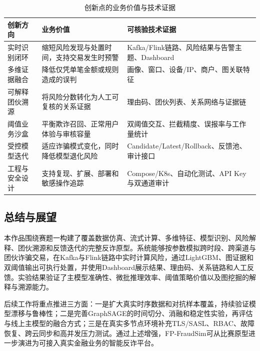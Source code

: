 \begin{table}[H]
  \centering
  \caption{创新点的业务价值与技术证据}
  \label{tab:innovation_value}
  \renewcommand\arraystretch{1.32}
  \setlength{\tabcolsep}{4pt}
  {\songti{}
  \begin{tabularx}{0.97\textwidth}{>{\raggedright\arraybackslash}p{2.4cm}>{\raggedright\arraybackslash}X>{\raggedright\arraybackslash}X}
    \toprule
    创新方向 & 业务价值 & 可核验技术证据 \\
    \midrule
    实时识别闭环 & 缩短风险发现与处置时间，支持交易发生时预警 & Kafka/Flink链路、风险结果与告警主题、Dashboard \\
    多维证据融合 & 降低仅凭单笔金额或规则造成的误判 & 画像、窗口、设备/IP、商户、图关联特征 \\
    可解释团伙溯源 & 将风险分数转化为人工可复核的关系证据 & 理由码、团伙列表、关系网络与证据链 \\
    阈值业务沙盒 & 平衡欺诈召回、正常用户体验与审核容量 & 双阈值交互、拦截精度、误报率与工作量统计 \\
    受控模型迭代 & 适应诈骗模式变化，同时降低模型退化风险 & Candidate/Latest/Rollback、反馈池、审计接口 \\
    工程与安全设计 & 支持复现、扩展、部署和敏感操作追踪 & Compose/K8s、自动化测试、API Key与双通道审计 \\
    \bottomrule
  \end{tabularx}}
\end{table}

\subsection{总结与展望}

本作品围绕赛题一构建了覆盖数据仿真、流式计算、多维特征、模型识别、风险解释、团伙溯源和反馈迭代的完整反诈原型。系统能够按参数模拟跨时段、跨渠道与团伙诈骗交易，在Kafka与Flink链路中实时计算风险，通过LightGBM、图证据和双阈值输出可执行处置，并使用Dashboard展示结果、理由码、关系链路和人工反馈。实验结果验证了主模型准确性、微批推理效率、阈值策略价值以及图挖掘的解释与溯源能力。

后续工作将重点推进三方面：一是扩大真实时序数据和对抗样本覆盖，持续验证模型漂移与鲁棒性；二是完善GraphSAGE的时间切分、消融和稳定性实验，再评估与线上主模型的融合方式；三是在真实多节点环境补充TLS/SASL、RBAC、故障恢复、跨云同步和高并发压力测试。通过上述增强，FP-FraudSim可从比赛原型进一步演进为可接入真实金融业务的智能反诈平台。
